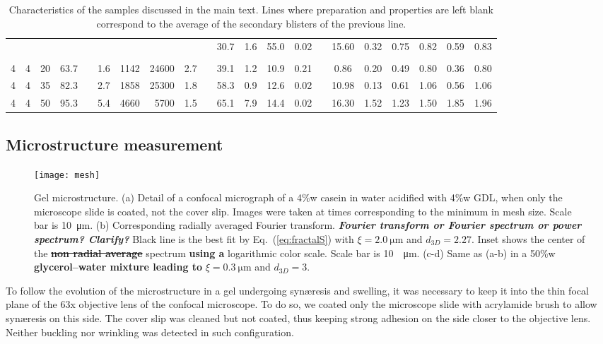 \documentclass[twocolumn,superscriptaddress,showpacs,preprintnumbers,
amsmath,amssymb,prl]{revtex4-1}
\newcommand{\seb}[1]{\textbf{\color{blue}#1}} %
\newcommand{\sseb}[1]{\sout{\textbf{\color{blue}#1}}} %
\begin{document}
\begin{table*}
\begin{tabular}{SSSScSrrScSSSScSSSSSS}
& & & && & & & && 30.7 & 1.6 & 55.0 & 0.02 && 15.60 & 0.32 & 0.75 & 0.82 & 0.59 & 0.83 \\
   \\[-2ex]
4 & 4 & 20 & 63.7 && 1.6 & 1142 & 24600 & 2.7 && 39.1 & 1.2 & 10.9 & 0.21 && 0.86 & 0.20 & 0.49 & 0.80 & 0.36 & 0.80 \\ 
4 & 4 & 35 & 82.3 && 2.7 & 1858 & 25300 & 1.8 && 58.3 & 0.9 & 12.6 & 0.02 && 10.98 & 0.13 & 0.61 & 1.06 & 0.56 & 1.06 \\ 
4 & 4 & 50 & 95.3 && 5.4 & 4660 & 5700 & 1.5 && 65.1 & 7.9 & 14.4 & 0.02 && 16.30 & 1.52 & 1.23 & 1.50 & 1.85 & 1.96 \\ 
\end{tabular}
\caption{Characteristics of the samples discussed in the main text. Lines where preparation and properties are left blank correspond to the average of the secondary blisters of the previous line.}
\label{tab:data}
\end{table*}

\subsection*{Microstructure measurement}

\begin{figure}
	\texttt{[image: mesh]}
	\caption{Gel microstructure. (a) Detail of a confocal micrograph of a 4\%w casein in water acidified with 4\%w GDL, when only the microscope slide is coated, not the cover slip. Images were taken at times corresponding to the minimum in mesh size. Scale bar is \SI{10}{\micro\metre}. (b) Corresponding radially averaged Fourier transform. \seb{\it Fourier transform or Fourier spectrum or power spectrum? Clarify?} Black line is the best fit by Eq.~(\ref{eq:fractalS}) with $\xi=\SI{2.0}{\micro\metre}$ and $d_{3D}=2.27$. Inset shows the center of the \sseb{non radial average} spectrum \seb{using a} logarithmic color scale. Scale bar is \SI{10}{\per\micro\metre}. (c-d) Same as (a-b) in a 50\%w \seb{glycerol--water mixture leading to} $\xi=\SI{0.3}{\micro\metre}$ and $d_{3D}=3$.}
	\label{fig:mesh}
\end{figure}

To follow the evolution of the microstructure in a gel undergoing syn\ae{}resis and swelling, it was necessary to keep it into the thin focal plane of the 63x objective lens of the confocal microscope. To do so, we coated only the microscope slide with acrylamide brush to allow syn\ae{}resis on this side. The cover slip was cleaned but not coated, thus keeping strong adhesion on the side closer to the objective lens. Neither buckling nor wrinkling was detected in such configuration.
\end{document}
